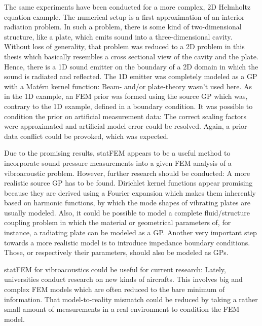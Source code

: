 \documentclass[%
  a4paper,oneside,%
  11pt,%
  smallchapters,
  style=printdev,
  extramargin,
  green,%
  rgb, <cmyk>
  ]{tubsbook}
\begin{document}
The same experiments have been conducted for a more complex, 2D Helmholtz equation example. The numerical setup is a first approximation of an interior radiation problem. In such a problem, there is some kind of two-dimensional structure, like a plate, which emits sound into a three-dimensional cavity. Without loss of generality, that problem was reduced to a 2D problem in this thesis which basically resembles a cross sectional view of the cavity and the plate. Hence, there is a 1D sound emitter on the boundary of a 2D domain in which the sound is radiated and reflected. The 1D emitter was completely modeled as a GP with a Mat\'ern kernel function:  Beam- and/or plate-theory wasn't used here.  As in the 1D example, an FEM prior was formed using the source GP which was, contrary to the 1D example, defined in a boundary condition. It was possible to condition the prior on artificial measurement data: The correct scaling factors were approximated and artificial model error could be resolved. Again, a prior-data conflict could be provoked, which was expected. 

Due to the promising results, statFEM appears to be a useful method to incorporate sound pressure measurements into a given FEM analysis of a vibroacoustic problem. However, further research should be conducted: A more realistic source GP has to be found. Dirichlet kernel functions appear promising because they are derived using a Fourier expansion which makes them inherently based on harmonic functions, by which the mode shapes of vibrating plates are usually modeled. Also, it could be possible to model a complete fluid/structure coupling problem in which the material or geometrical parameters of, for instance, a radiating plate can be modeled as a GP. Another very important step towards a more realistic model is to introduce impedance boundary conditions. Those, or respectively their parameters, should also be modeled as GPs. 

statFEM for vibroacoustics could be useful for current research: Lately, universities conduct research on new kinds of aircrafts. This involves big and complex FEM models which are often reduced to the bare minimum of information. That model-to-reality mismatch could be reduced by taking a rather small amount of measurements in a real environment to condition the FEM model. 
\end{document}
